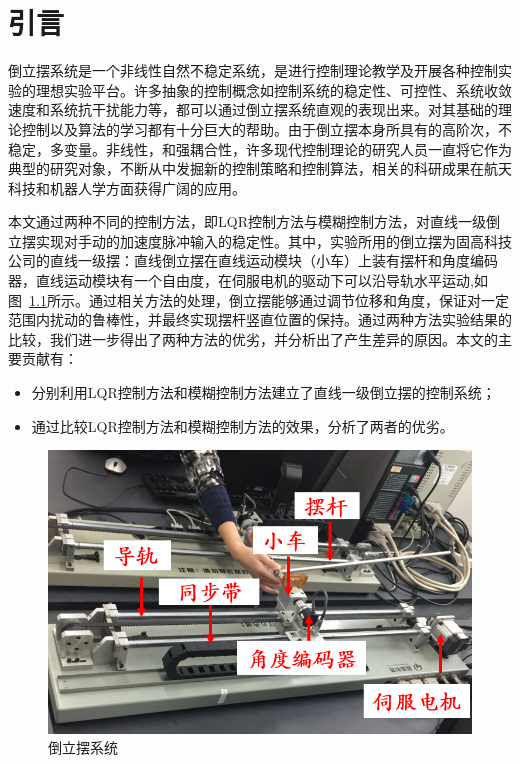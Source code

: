 \chapter{引言}
倒立摆系统是一个非线性自然不稳定系统，是进行控制理论教学及开展各种控制实验的理想实验平台。许多抽象的控制概念如控制系统的稳定性、可控性、系统收敛速度和系统抗干扰能力等，都可以通过倒立摆系统直观的表现出来。对其基础的理论控制以及算法的学习都有十分巨大的帮助。由于倒立摆本身所具有的高阶次，不稳定，多变量。非线性，和强耦合性，许多现代控制理论的研究人员一直将它作为典型的研究对象，不断从中发掘新的控制策略和控制算法，相关的科研成果在航天科技和机器人学方面获得广阔的应用。

本文通过两种不同的控制方法，即LQR控制方法与模糊控制方法，对直线一级倒立摆实现对手动的加速度脉冲输入的稳定性。其中，实验所用的倒立摆为固高科技公司的直线一级摆：直线倒立摆在直线运动模块（小车）上装有摆杆和角度编码器，直线运动模块有一个自由度，在伺服电机的驱动下可以沿导轨水平运动,如图~\ref{fig:realthing}所示。通过相关方法的处理，倒立摆能够通过调节位移和角度，保证对一定范围内扰动的鲁棒性，并最终实现摆杆竖直位置的保持。通过两种方法实验结果的比较，我们进一步得出了两种方法的优劣，并分析出了产生差异的原因。本文的主要贡献有：
  \begin{itemize}
    \item 分别利用LQR控制方法和模糊控制方法建立了直线一级倒立摆的控制系统；
    \item 通过比较LQR控制方法和模糊控制方法的效果，分析了两者的优劣。
  \end{itemize}

\begin{figure}[hbpt]
\centering
\includegraphics[width=12cm]{realthing.png}
\caption{倒立摆系统}\label{fig:realthing}
\end{figure}



